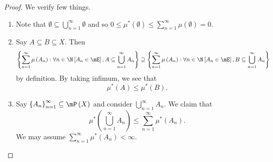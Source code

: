 \documentclass[pmath451]{subfiles}
\begin{document}
    \begin{proof}
        We verify few things.
        \begin{enumerate}
            \item Note that $\emptyset\subseteq\bigcup^{\infty}_{n=1}\emptyset$ and so $0\leq\mu^{*}\left( \emptyset \right)\leq\sum^{\infty}_{n=1} \mu\left( \emptyset \right) =0$.

            \item Say $A\subseteq B\subseteq X$. Then
                \begin{equation*}
                    \left\lbrace \sum^{\infty}_{n=1}\mu\left( A_n \right) : \forall n\in\N\left[ A_n\in\mE \right], A\subseteq\bigcup^{\infty}_{n=1}A_n \right\rbrace \supseteq
                    \left\lbrace \sum^{\infty}_{n=1}\mu\left( A_n \right) : \forall n\in\N\left[ A_n\in\mE \right], B\subseteq\bigcup^{\infty}_{n=1}A_n \right\rbrace
                \end{equation*}
                by definition. By taking infimum, we see that
                \begin{equation*}
                    \mu^{*}\left( A \right)\leq\mu^{*}\left( B \right).
                \end{equation*}

            \item Say $\left\lbrace A_n \right\rbrace^{\infty}_{n=1}\subseteq\mP\left( X \right)$ and consider $\bigcup^{\infty}_{n=1} A_n$. We claim that
                \begin{equation*}
                    \mu^{*}\left( \bigcup^{\infty}_{n=1}A_n \right) \leq \sum^{\infty}_{n=1} \mu^{*}\left( A_n \right).
                \end{equation*}
                We may assume $\sum^{\infty}_{n=1}\mu^{*}\left( A_n \right)<\infty$.


\end{enumerate}
\end{proof}
\end{document}
